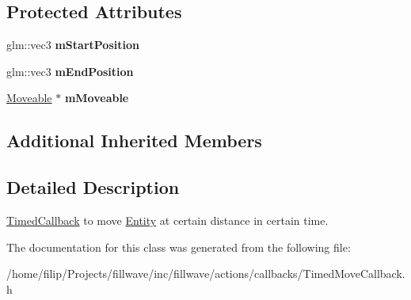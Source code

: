 \subsection*{Protected Attributes}
\begin{DoxyCompactItemize}
\item 
glm\+::vec3 {\bfseries m\+Start\+Position}\hypertarget{classflw_1_1flf_1_1TimedMoveCallback_a1c316a028033e871b362cded9f70136a}{}\label{classflw_1_1flf_1_1TimedMoveCallback_a1c316a028033e871b362cded9f70136a}

\item 
glm\+::vec3 {\bfseries m\+End\+Position}\hypertarget{classflw_1_1flf_1_1TimedMoveCallback_a3076475ded6d11f056abde869ca63f29}{}\label{classflw_1_1flf_1_1TimedMoveCallback_a3076475ded6d11f056abde869ca63f29}

\item 
\hyperlink{classflw_1_1flf_1_1Moveable}{Moveable} $\ast$ {\bfseries m\+Moveable}\hypertarget{classflw_1_1flf_1_1TimedMoveCallback_a111b07893e65909a6d0a2986ea995a3d}{}\label{classflw_1_1flf_1_1TimedMoveCallback_a111b07893e65909a6d0a2986ea995a3d}

\end{DoxyCompactItemize}
\subsection*{Additional Inherited Members}


\subsection{Detailed Description}
\hyperlink{classflw_1_1flf_1_1TimedCallback}{Timed\+Callback} to move \hyperlink{classflw_1_1flf_1_1Entity}{Entity} at certain distance in certain time. 

The documentation for this class was generated from the following file\+:\begin{DoxyCompactItemize}
\item 
/home/filip/\+Projects/fillwave/inc/fillwave/actions/callbacks/Timed\+Move\+Callback.\+h\end{DoxyCompactItemize}
